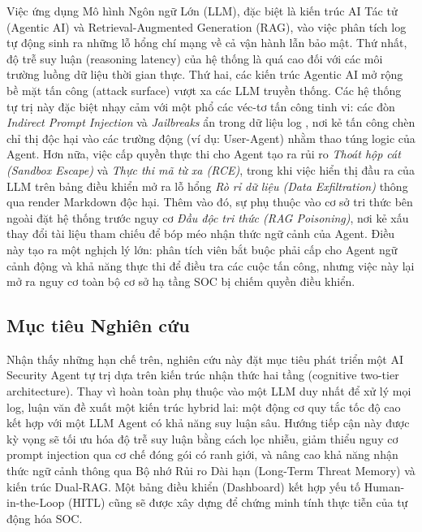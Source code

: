 \documentclass[12pt,a4paper]{article}
\begin{document}
Việc ứng dụng Mô hình Ngôn ngữ Lớn (LLM), đặc biệt là kiến trúc AI Tác tử (Agentic AI) và Retrieval-Augmented Generation (RAG), vào việc phân tích log tự động sinh ra những lỗ hổng chí mạng về cả vận hành lẫn bảo mật. Thứ nhất, độ trễ suy luận (reasoning latency) của hệ thống là quá cao đối với các môi trường luồng dữ liệu thời gian thực. Thứ hai, các kiến trúc Agentic AI mở rộng bề mặt tấn công (attack surface) vượt xa các LLM truyền thống. Các hệ thống tự trị này đặc biệt nhạy cảm với một phổ các véc-tơ tấn công tinh vi: các đòn \textit{Indirect Prompt Injection} và \textit{Jailbreaks} ẩn trong dữ liệu log \cite{greshake2023}, nơi kẻ tấn công chèn chỉ thị độc hại vào các trường động (ví dụ: User-Agent) nhằm thao túng logic của Agent. Hơn nữa, việc cấp quyền thực thi cho Agent tạo ra rủi ro \textit{Thoát hộp cát (Sandbox Escape)} và \textit{Thực thi mã từ xa (RCE)}, trong khi việc hiển thị đầu ra của LLM trên bảng điều khiển mở ra lỗ hổng \textit{Rò rỉ dữ liệu (Data Exfiltration)} thông qua render Markdown độc hại. Thêm vào đó, sự phụ thuộc vào cơ sở tri thức bên ngoài đặt hệ thống trước nguy cơ \textit{Đầu độc tri thức (RAG Poisoning)}, nơi kẻ xấu thay đổi tài liệu tham chiếu để bóp méo nhận thức ngữ cảnh của Agent. Điều này tạo ra một nghịch lý lớn: phân tích viên bắt buộc phải cấp cho Agent ngữ cảnh động và khả năng thực thi để điều tra các cuộc tấn công, nhưng việc này lại mở ra nguy cơ toàn bộ cơ sở hạ tầng SOC bị chiếm quyền điều khiển.

\subsection{Mục tiêu Nghiên cứu}
Nhận thấy những hạn chế trên, nghiên cứu này đặt mục tiêu phát triển một AI Security Agent tự trị dựa trên kiến trúc nhận thức hai tầng (cognitive two-tier architecture). Thay vì hoàn toàn phụ thuộc vào một LLM duy nhất để xử lý mọi log, luận văn đề xuất một kiến trúc hybrid lai: một động cơ quy tắc tốc độ cao kết hợp với một LLM Agent có khả năng suy luận sâu. Hướng tiếp cận này được kỳ vọng sẽ tối ưu hóa độ trễ suy luận bằng cách lọc nhiễu, giảm thiểu nguy cơ prompt injection qua cơ chế đóng gói có ranh giới, và nâng cao khả năng nhận thức ngữ cảnh thông qua Bộ nhớ Rủi ro Dài hạn (Long-Term Threat Memory) và kiến trúc Dual-RAG. Một bảng điều khiển (Dashboard) kết hợp yếu tố Human-in-the-Loop (HITL) cũng sẽ được xây dựng để chứng minh tính thực tiễn của tự động hóa SOC.
\end{document}
